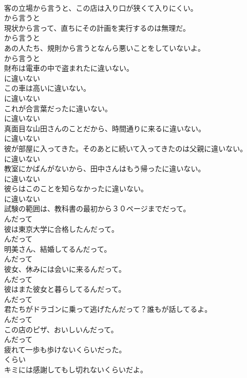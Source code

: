 \documentclass[8pt]{extreport}
\begin{document}
\begin{CJK}{UTF8}{min}
\\	客の立場から言うと、この店は入り口が狭くて入りにくい。	
\\	から言うと
\\	現状から言って、直ちにその計画を実行するのは無理だ。	
\\	から言うと
\\	あの人たち、規則から言うとなんら悪いことをしていないよ。	
\\	から言うと
\\	財布は電車の中で盗まれたに違いない。	
\\	に違いない
\\	この車は高いに違いない。	
\\	に違いない
\\	これが合言葉だったに違いない。	
\\	に違いない
\\	真面目な山田さんのことだから、時間通りに来るに違いない。	
\\	に違いない
\\	彼が部屋に入ってきた。そのあとに続いて入ってきたのは父親に違いない。	
\\	に違いない
\\	教室にかばんがないから、田中さんはもう帰ったに違いない。	
\\	に違いない
\\	彼らはこのことを知らなかったに違いない。	
\\	に違いない
\\	試験の範囲は、教科書の最初から３０ページまでだって。	
\\	んだって
\\	彼は東京大学に合格したんだって。	
\\	んだって
\\	明美さん、結婚してるんだって。	
\\	んだって
\\	彼女、休みには会いに来るんだって。	
\\	んだって
\\	彼はまた彼女と暮らしてるんだって。	
\\	んだって
\\	君たちがドラゴンに乗って逃げたんだって？誰もが話してるよ。	
\\	んだって
\\	この店のピザ、おいしいんだって。	
\\	んだって
\\	疲れて一歩も歩けないくらいだった。	
\\	くらい
\\	キミには感謝してもし切れないくらいだよ。	

\end{CJK}
\end{document}
